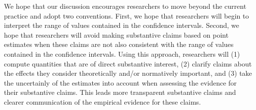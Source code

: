 \documentclass[12pt]{article}
\begin{document}
We hope that our discussion encourages researchers to move beyond the current practice and adopt two conventions. First, we hope that researchers will begin to interpret the range of values contained in the confidence intervals. Second, we hope that researchers will avoid making substantive claims based on point estimates when these claims are not also consistent with the range of values contained in the confidence intervals. Using this approach, researchers will (1) compute quantities that are of direct substantive interest, (2) clarify claims about the effects they consider theoretically and/or normatively important, and (3) take the uncertainly of the estimates into account when assessing the evidence for their substantive claims. This leads more transparent substantive claims and clearer communication of the empirical evidence for these claims.


\singlespace

%

%
\end{document}
